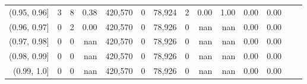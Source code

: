 \begin{tabular}{rrrrrrrrrrrrrr}
(0.95, 0.96]   &       3 &      8 &    0.38 &  420,570 &        0 &  78,924 &       2 &  0.00 &  1.00 &  0.00 &      0.00 \\
(0.96, 0.97]   &       0 &      2 &    0.00 &  420,570 &        0 &  78,926 &       0 &   nan &   nan &  0.00 &      0.00 \\
(0.97, 0.98]   &       0 &      0 &     nan &  420,570 &        0 &  78,926 &       0 &   nan &   nan &  0.00 &      0.00 \\
(0.98, 0.99]   &       0 &      0 &     nan &  420,570 &        0 &  78,926 &       0 &   nan &   nan &  0.00 &      0.00 \\
(0.99, 1.0]    &       0 &      0 &     nan &  420,570 &        0 &  78,926 &       0 &   nan &   nan &  0.00 &      0.00 \\
\bottomrule
\end{tabular}
